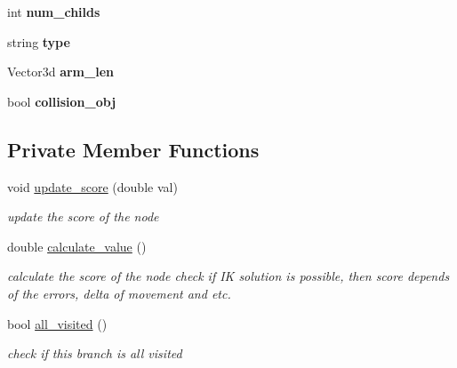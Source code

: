 \begin{DoxyCompactItemize}
\mbox{\label{classMCT__NODE_a3befbdb55ceb274d38bb16dc339a7d6f}} 
int {\bfseries num\+\_\+childs}
\item 
\mbox{\label{classMCT__NODE_a059636c69a0f512af7a949dcf2b57a4f}} 
string {\bfseries type}
\item 
\mbox{\label{classMCT__NODE_a024f5b5a02e9a31a57064a55466c34b7}} 
Vector3d {\bfseries arm\+\_\+len}
\item 
\mbox{\label{classMCT__NODE_ae1c0a686ad954f7d60f4084ed73e5cc3}} 
bool {\bfseries collision\+\_\+obj}
\end{DoxyCompactItemize}
\subsection*{Private Member Functions}
\begin{DoxyCompactItemize}
\item 
void \hyperlink{classMCT__NODE_aa6e0f2afcf3db54d05e6f6e4a6a31c0f}{update\+\_\+score} (double val)
\begin{DoxyCompactList}\small\item\em update the score of the node \end{DoxyCompactList}\item 
double \hyperlink{classMCT__NODE_aae9490861298c2419fe9c86991868c39}{calculate\+\_\+value} ()
\begin{DoxyCompactList}\small\item\em calculate the score of the node check if IK solution is possible, then score depends of the errors, delta of movement and etc. \end{DoxyCompactList}\item 
bool \hyperlink{classMCT__NODE_af3aca71d80572feca02667b2963bcf74}{all\+\_\+visited} ()
\begin{DoxyCompactList}\small\item\em check if this branch is all visited \end{DoxyCompactList}\end{DoxyCompactItemize}
